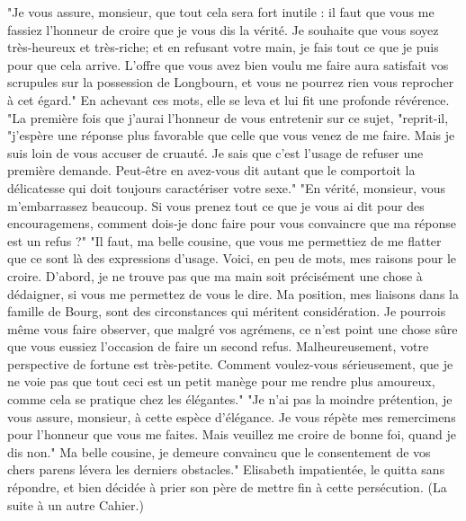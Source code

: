 "Je vous assure, monsieur, que tout cela sera fort inutile : il faut que vous me fassiez\setcounter{page}{411} l'honneur de croire que je vous dis la vérité. Je souhaite que vous soyez très-heureux et très-riche; et en refusant votre main, je fais tout ce que je puis pour que cela arrive. L'offre que vous avez bien voulu me faire aura satisfait vos scrupules sur la possession de Longbourn, et vous ne pourrez rien vous reprocher à cet égard."
En achevant ces mots, elle se leva et lui fit une profonde révérence.
"La première fois que j'aurai l'honneur de vous entretenir sur ce sujet, "reprit-il, "j'espère une réponse plus favorable que celle que vous venez de me faire. Mais je suis loin de vous accuser de cruauté. Je sais que c'est l'usage de refuser une première demande. Peut-être en avez-vous dit autant que le comportoit la délicatesse qui doit toujours caractériser votre sexe."
"En vérité, monsieur, vous m'embarrassez beaucoup. Si vous prenez tout ce que je vous ai dit pour des encouragemens, comment dois-je donc faire pour vous convaincre que ma réponse est un refus ?"
"Il faut, ma belle cousine, que vous me permettiez de me flatter que ce sont là des expressions d'usage. Voici, en peu de mots, mes raisons pour le croire. D'abord, je ne\setcounter{page}{412} trouve pas que ma main soit précisément une chose à dédaigner, si vous me permettez de vous le dire. Ma position, mes liaisons dans la famille de Bourg, sont des circonstances qui méritent considération. Je pourrois même vous faire observer, que malgré vos agrémens, ce n'est point une chose sûre que vous eussiez l'occasion de faire un second refus. Malheureusement, votre perspective de fortune est très-petite. Comment voulez-vous sérieusement, que je ne voie pas que tout ceci est un petit manège pour me rendre plus amoureux, comme cela se pratique chez les élégantes."
"Je n'ai pas la moindre prétention, je vous assure, monsieur, à cette espèce d'élégance. Je vous répète mes remercimens pour l'honneur que vous me faites. Mais veuillez me croire de bonne foi, quand je dis non."
Ma belle cousine, je demeure convaincu que le consentement de vos chers parens lévera les derniers obstacles."
Elisabeth impatientée, le quitta sans répondre, et bien décidée à prier son père de mettre fin à cette persécution.
(La suite à un autre Cahier.)